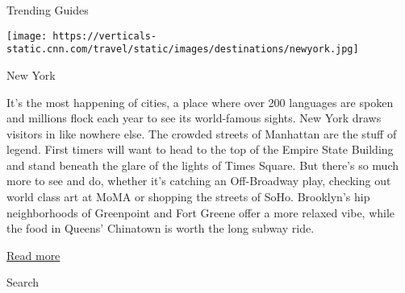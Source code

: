 Trending Guides

\texttt{[image: https://verticals-static.cnn.com/travel/static/images/destinations/newyork.jpg]}

New York

It's the most happening of cities, a place where over 200 languages are
spoken and millions flock each year to see its world-famous sights. New
York draws visitors in like nowhere else. The crowded streets of
Manhattan are the stuff of legend. First timers will want to head to the
top of the Empire State Building and stand beneath the glare of the
lights of Times Square. But there's so much more to see and do, whether
it's catching an Off-Broadway play, checking out world class art at MoMA
or shopping the streets of SoHo. Brooklyn's hip neighborhoods of
Greenpoint and Fort Greene offer a more relaxed vibe, while the food in
Queens' Chinatown is worth the long subway ride.

\href{/travel/destinations/new-york}{Read more}

Search

